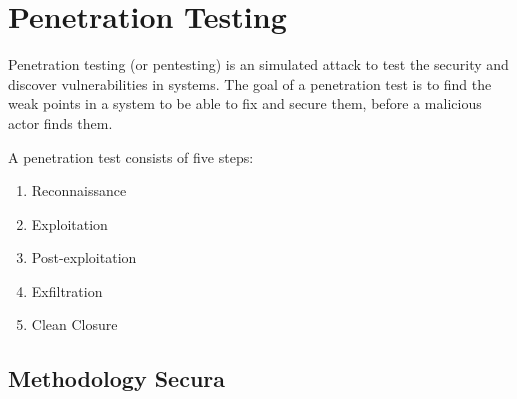 \section{Penetration Testing}
Penetration testing (or pentesting) is an simulated attack to test the security and discover vulnerabilities in systems. The goal of a penetration test is to find the weak points in a system to be able to fix and secure them, before a malicious actor finds them.

\hfill

A penetration test consists of five steps:
\begin{enumerate}
    \item Reconnaissance
    \item Exploitation
    \item Post-exploitation
    \item Exfiltration
    \item Clean Closure
\end{enumerate}

\subsection{Methodology Secura}
